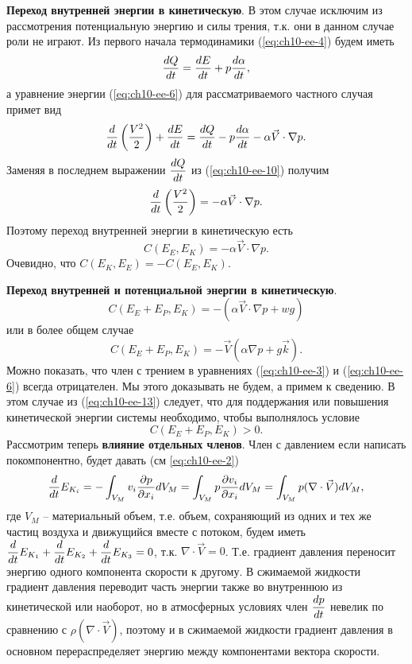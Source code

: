 \textbf{Переход внутренней энергии в кинетическую}. В этом случае исключим из рассмотрения потенциальную энергию и силы трения, т.к. они в данном случае роли не играют. Из первого начала термодинамики (\ref{eq:ch10-ee-4}) будем иметь 
\begin{equation}
    \label{eq:ch10-ee-10}
    \displaystyle\frac{d Q}{d t}=\displaystyle\frac{d E}{d t}+p\displaystyle\frac{d \alpha}{d t},
\end{equation}
а уравнение энергии (\ref{eq:ch10-ee-6}) для рассматриваемого частного случая примет вид
\begin{equation*}
    \displaystyle\frac{d }{d t} \displaystyle \left(  \frac{V^2}{2}  \right) + \displaystyle\frac{d E}{d t}= \displaystyle\frac{d Q}{d t} - p \displaystyle\frac{d \alpha}{d t} - \alpha\vec{V} \cdot \nabla p.
\end{equation*}
Заменяя в последнем выражении $\displaystyle\frac{d Q}{d t}$ из (\ref{eq:ch10-ee-10}) получим
\begin{equation}
\label{eq:ch10-ee-11}
    \displaystyle\frac{d }{d t} \displaystyle \left(  \frac{V^2}{2}  \right) = - \alpha\vec{V} \cdot \nabla p.
\end{equation}
Поэтому переход внутренней энергии в кинетическую есть 
\begin{equation}
\label{eq:ch10-ee-12}
    C(E_E,E_K) = - \alpha\vec{V} \cdot \nabla p.
\end{equation}
Очевидно, что $C(E_K,E_E) = -C(E_E,E_K)$.

\textbf{Переход внутренней и потенциальной энергии в кинетическую}. 
\begin{equation*}
    C(E_E+E_P,E_K) = - (\alpha\vec{V} \cdot \nabla p + wg)
\end{equation*}
или в более общем случае 
\begin{equation}
    \label{eq:ch10-ee-13}
    C(E_E+E_P,E_K) = -\vec{V}(\alpha\nabla p + g\vec{k}).
\end{equation}
Можно показать, что член с трением в уравнениях (\ref{eq:ch10-ee-3}) и (\ref{eq:ch10-ee-6}) всегда отрицателен. Мы этого доказывать не будем, а примем к сведению. В этом случае из (\ref{eq:ch10-ee-13}) следует, что для поддержания или повышения кинетической энергии системы необходимо, чтобы выполнялось условие
\begin{equation*}
    C(E_E+E_P,E_K) > 0.
\end{equation*}
Рассмотрим теперь \textbf{влияние отдельных членов}. Член с давлением если написать покомпонентно, будет давать (см \ref{eq:ch10-ee-2})
\begin{equation*}
    \displaystyle\frac{d }{d t} E_{K_i} = - \int_{V_M}v_i\displaystyle\frac{\partial p}{\partial x_i}dV_M = \int_{V_M}p\displaystyle\frac{\partial v_i}{\partial x_i}dV_M=\int_{V_M}p(\nabla\cdot\vec{V})dV_M,
\end{equation*}
где $V_M$ -- материальный объем, т.е. объем, сохраняющий из одних и тех же частиц воздуха и движущийся вместе с потоком, будем иметь $\displaystyle\frac{d }{d t}E_{K_1}+\displaystyle\frac{d }{d t}E_{K_2}+\displaystyle\frac{d }{d t}E_{K_3}=0$, т.к. $\nabla\cdot\vec{V}=0$. Т.е. градиент давления переносит энергию одного компонента скорости к другому. В сжимаемой жидкости градиент давления переводит часть энергии также во внутреннюю из кинетической или наоборот, но в атмосферных условиях член $\displaystyle\frac{d p}{d t}$ невелик по сравнению с $\rho (\nabla\cdot\vec{V})$, поэтому и в сжимаемой жидкости градиент давления в основном перераспределяет энергию между компонентами вектора скорости.

